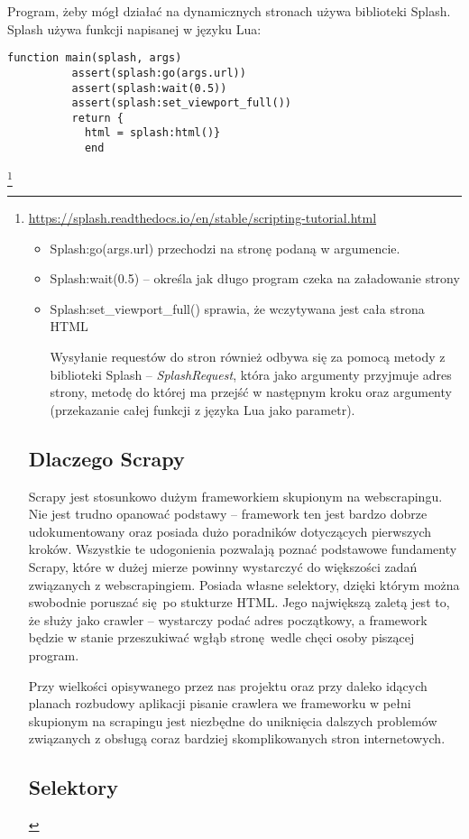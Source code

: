 Program, żeby mógł działać na dynamicznych stronach używa biblioteki Splash.
Splash używa funkcji napisanej w języku Lua:
\begin{lstlisting}
function main(splash, args)
          assert(splash:go(args.url))
          assert(splash:wait(0.5))
          assert(splash:set_viewport_full())
          return {
            html = splash:html()}
            end
\end{lstlisting}\footnote{\url{https://splash.readthedocs.io/en/stable/scripting-tutorial.html}
\begin{itemize}
\item[] Splash:go(args.url) przechodzi na stronę podaną w argumencie.
\item[] Splash:wait(0.5) – określa jak długo program czeka na załadowanie strony
\item[] Splash:set\_viewport\_full() sprawia, że wczytywana jest cała strona HTML

Wysyłanie requestów do stron również odbywa się za pomocą metody z biblioteki Splash -- \emph{SplashRequest}, która jako argumenty przyjmuje adres strony, metodę do której ma przejść w następnym kroku oraz argumenty (przekazanie całej funkcji z języka Lua jako parametr).
\end{itemize}
\section{Dlaczego Scrapy}

Scrapy jest stosunkowo dużym frameworkiem skupionym na webscrapingu. Nie jest trudno opanować podstawy -- framework ten jest bardzo dobrze udokumentowany oraz posiada dużo poradników dotyczących pierwszych kroków. Wszystkie te udogonienia pozwalają poznać podstawowe fundamenty Scrapy, które w dużej mierze powinny wystarczyć do większości zadań związanych z webscrapingiem. Posiada własne selektory, dzięki którym można swobodnie poruszać się po stukturze HTML. Jego największą zaletą jest to, że służy jako crawler -- wystarczy podać adres początkowy, a framework będzie w stanie przeszukiwać wgłąb stronę wedle chęci osoby piszącej program.

Przy wielkości opisywanego przez nas projektu oraz przy daleko idących planach rozbudowy aplikacji pisanie crawlera we frameworku w pełni skupionym na scrapingu jest niezbędne do uniknięcia dalszych problemów związanych z obsługą coraz bardziej skomplikowanych stron internetowych.
\subsection{Selektory}

}
